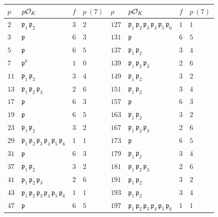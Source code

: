 \begin{figure}
  \begin{center}
    \renewcommand{\arraystretch}{1.5}
    \begin{tabular}{x{1cm}x{2.5cm}x{1cm}x{1.25cm}x{1cm}x{2.5cm}x{1cm}x{1.25cm}}
      $p$ & $p\mathcal{O}_K$ & $f$ & $p~(7)$ & $p$ & $p\mathcal{O}_K$ & $f$ & $p~(7)$ \tabularnewline
      \hline
      $2$ & $\mathfrak{p}_1\,\mathfrak{p}_2$ & $3$ & $2$ & $127$ & $\mathfrak{p}_1\,\mathfrak{p}_2\,\mathfrak{p}_3\,\mathfrak{p}_4\,\mathfrak{p}_5\,\mathfrak{p}_6$ & $1$ & $1$ \tabularnewline
      \hline
      $3$ & $\mathfrak{p}$ & $6$ & $3$ & $131$ & $\mathfrak{p}$ & $6$ & $5$ \tabularnewline
      \hline
      $5$ & $\mathfrak{p}$ & $6$ & $5$ & $137$ & $\mathfrak{p}_1\,\mathfrak{p}_2$ & $3$ & $4$ \tabularnewline
      \hline
      $7$ & $\mathfrak{p}^6$ & $1$ & $0$ & $139$ & $\mathfrak{p}_1\,\mathfrak{p}_2\,\mathfrak{p}_3$ & $2$ & $6$ \tabularnewline
      \hline
      $11$ & $\mathfrak{p}_1\,\mathfrak{p}_2$ & $3$ & $4$ & $149$ & $\mathfrak{p}_1\,\mathfrak{p}_2$ & $3$ & $2$ \tabularnewline
      \hline
      $13$ & $\mathfrak{p}_1\,\mathfrak{p}_2\,\mathfrak{p}_3$ & $2$ & $6$ & $151$ & $\mathfrak{p}_1\,\mathfrak{p}_2$ & $3$ & $4$ \tabularnewline
      \hline
      $17$ & $\mathfrak{p}$ & $6$ & $3$ & $157$ & $\mathfrak{p}$ & $6$ & $3$ \tabularnewline
      \hline
      $19$ & $\mathfrak{p}$ & $6$ & $5$ & $163$ & $\mathfrak{p}_1\,\mathfrak{p}_2$ & $3$ & $2$ \tabularnewline
      \hline
      $23$ & $\mathfrak{p}_1\,\mathfrak{p}_2$ & $3$ & $2$ & $167$ & $\mathfrak{p}_1\,\mathfrak{p}_2\,\mathfrak{p}_3$ & $2$ & $6$ \tabularnewline
      \hline
      $29$ & $\mathfrak{p}_1\,\mathfrak{p}_2\,\mathfrak{p}_3\,\mathfrak{p}_4\,\mathfrak{p}_5\,\mathfrak{p}_6$ & $1$ & $1$ & $173$ & $\mathfrak{p}$ & $6$ & $5$ \tabularnewline
      \hline
      $31$ & $\mathfrak{p}$ & $6$ & $3$ & $179$ & $\mathfrak{p}_1\,\mathfrak{p}_2$ & $3$ & $4$ \tabularnewline
      \hline
      $37$ & $\mathfrak{p}_1\,\mathfrak{p}_2$ & $3$ & $2$ & $181$ & $\mathfrak{p}_1\,\mathfrak{p}_2\,\mathfrak{p}_3$ & $2$ & $6$ \tabularnewline
      \hline
      $41$ & $\mathfrak{p}_1\,\mathfrak{p}_2\,\mathfrak{p}_3$ & $2$ & $6$ & $191$ & $\mathfrak{p}_1\,\mathfrak{p}_2$ & $3$ & $2$ \tabularnewline
      \hline
      $43$ & $\mathfrak{p}_1\,\mathfrak{p}_2\,\mathfrak{p}_3\,\mathfrak{p}_4\,\mathfrak{p}_5\,\mathfrak{p}_6$ & $1$ & $1$ & $193$ & $\mathfrak{p}_1\,\mathfrak{p}_2$ & $3$ & $4$ \tabularnewline
      \hline
      $47$ & $\mathfrak{p}$ & $6$ & $5$ & $197$ & $\mathfrak{p}_1\,\mathfrak{p}_2\,\mathfrak{p}_3\,\mathfrak{p}_4\,\mathfrak{p}_5\,\mathfrak{p}_6$ & $1$ & $1$ \tabularnewline

\end{tabular}
\end{center}
\end{figure}
